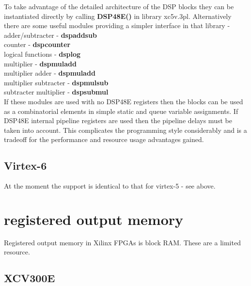             To take advantage of the detailed architecture of the DSP blocks
            they can be instantiated directly by calling
            {\bf DSP48E()}  in library xc5v.3pl.
            Alternatively there are some useful modules providing a simpler
            interface in that library - \\
            adder/subtracter - {\bf dspaddsub}  \\
            counter - {\bf dspcounter}  \\
            logical functions - {\bf dsplog}  \\
            multiplier - {\bf dspmuladd}  \\
            multiplier adder - {\bf dspmuladd}  \\
            multiplier subtracter - {\bf dspmulsub}  \\
            subtracter multiplier - {\bf dspsubmul}  \\
            
            If these modules are used with no DSP48E registers then the
            blocks can be used as a combinatorial elements in simple
            static and queue variable assignments. If DSP48E internal
            pipeline registers are used then the pipeline delays must
            be taken into account. This complicates the programming style
            considerably and is a tradeoff for the performance and resource
            usage advantages gained.

    
        \subsection{Virtex-6}
        
            At the moment the support is identical to that for virtex-5 -
            see above.




    \section{registered output memory}
    
        Registered output memory in Xilinx FPGAs is block RAM. These are a
        limited resource.
    
        \subsection{XCV300E}
        
